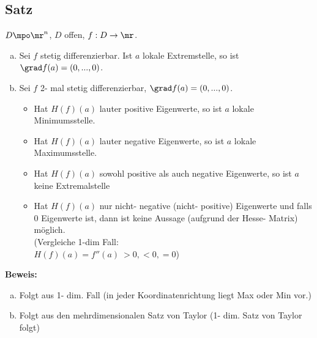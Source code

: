 \subsection{Satz}
	$ D\mpo\mr^n $, $ D $ offen, $ f:D\rightarrow\mr $.
	\begin{enumerate}[a)]
		\item Sei $ f $ stetig differenzierbar. Ist $ a $ lokale Extremstelle, so ist $ \grad f(a)=(0,...,0) $.
		\item  Sei $ f $ 2- mal stetig differenzierbar, $ \grad f(a)=(0,...,0) $.
		\begin{itemize}
			\item  Hat $ H(f)(a) $ lauter positive Eigenwerte, so ist $ a $ lokale Minimumsstelle.
			\item  Hat $ H(f)(a) $ lauter negative Eigenwerte, so ist $ a $ lokale Maximumsstelle.
			\item  Hat $ H(f)(a) $ sowohl positive als auch negative Eigenwerte, so ist $ a $ keine Extremalstelle
			\item Hat $ H(f)(a) $ nur nicht- negative (nicht- positive) Eigenwerte und falls 0 Eigenwerte ist, dann ist keine Aussage (aufgrund der Hesse- Matrix) möglich.\\
			(Vergleiche 1-dim Fall:\\
			$ H(f)(a)=f''(a)\ >0,<0,=0 $)
		\end{itemize}
	\end{enumerate}
	
	\textbf{Beweis:}
	\begin{enumerate}[a)]
		\item Folgt aus 1- dim. Fall (in jeder Koordinatenrichtung liegt Max oder Min vor.)
		\item  Folgt aus den mehrdimensionalen Satz von Taylor (1- dim. Satz von Taylor folgt)
	\end{enumerate}
	
